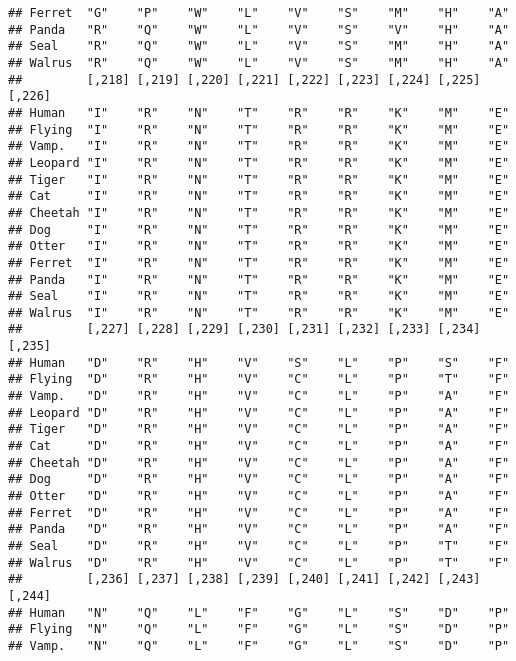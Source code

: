\documentclass[]{article}
\begin{document}
\begin{verbatim}
## Ferret  "G"    "P"    "W"    "L"    "V"    "S"    "M"    "H"    "A"   
## Panda   "R"    "Q"    "W"    "L"    "V"    "S"    "V"    "H"    "A"   
## Seal    "R"    "Q"    "W"    "L"    "V"    "S"    "M"    "H"    "A"   
## Walrus  "R"    "Q"    "W"    "L"    "V"    "S"    "M"    "H"    "A"   
##         [,218] [,219] [,220] [,221] [,222] [,223] [,224] [,225] [,226]
## Human   "I"    "R"    "N"    "T"    "R"    "R"    "K"    "M"    "E"   
## Flying  "I"    "R"    "N"    "T"    "R"    "R"    "K"    "M"    "E"   
## Vamp.   "I"    "R"    "N"    "T"    "R"    "R"    "K"    "M"    "E"   
## Leopard "I"    "R"    "N"    "T"    "R"    "R"    "K"    "M"    "E"   
## Tiger   "I"    "R"    "N"    "T"    "R"    "R"    "K"    "M"    "E"   
## Cat     "I"    "R"    "N"    "T"    "R"    "R"    "K"    "M"    "E"   
## Cheetah "I"    "R"    "N"    "T"    "R"    "R"    "K"    "M"    "E"   
## Dog     "I"    "R"    "N"    "T"    "R"    "R"    "K"    "M"    "E"   
## Otter   "I"    "R"    "N"    "T"    "R"    "R"    "K"    "M"    "E"   
## Ferret  "I"    "R"    "N"    "T"    "R"    "R"    "K"    "M"    "E"   
## Panda   "I"    "R"    "N"    "T"    "R"    "R"    "K"    "M"    "E"   
## Seal    "I"    "R"    "N"    "T"    "R"    "R"    "K"    "M"    "E"   
## Walrus  "I"    "R"    "N"    "T"    "R"    "R"    "K"    "M"    "E"   
##         [,227] [,228] [,229] [,230] [,231] [,232] [,233] [,234] [,235]
## Human   "D"    "R"    "H"    "V"    "S"    "L"    "P"    "S"    "F"   
## Flying  "D"    "R"    "H"    "V"    "C"    "L"    "P"    "T"    "F"   
## Vamp.   "D"    "R"    "H"    "V"    "C"    "L"    "P"    "A"    "F"   
## Leopard "D"    "R"    "H"    "V"    "C"    "L"    "P"    "A"    "F"   
## Tiger   "D"    "R"    "H"    "V"    "C"    "L"    "P"    "A"    "F"   
## Cat     "D"    "R"    "H"    "V"    "C"    "L"    "P"    "A"    "F"   
## Cheetah "D"    "R"    "H"    "V"    "C"    "L"    "P"    "A"    "F"   
## Dog     "D"    "R"    "H"    "V"    "C"    "L"    "P"    "A"    "F"   
## Otter   "D"    "R"    "H"    "V"    "C"    "L"    "P"    "A"    "F"   
## Ferret  "D"    "R"    "H"    "V"    "C"    "L"    "P"    "A"    "F"   
## Panda   "D"    "R"    "H"    "V"    "C"    "L"    "P"    "A"    "F"   
## Seal    "D"    "R"    "H"    "V"    "C"    "L"    "P"    "T"    "F"   
## Walrus  "D"    "R"    "H"    "V"    "C"    "L"    "P"    "T"    "F"   
##         [,236] [,237] [,238] [,239] [,240] [,241] [,242] [,243] [,244]
## Human   "N"    "Q"    "L"    "F"    "G"    "L"    "S"    "D"    "P"   
## Flying  "N"    "Q"    "L"    "F"    "G"    "L"    "S"    "D"    "P"   
## Vamp.   "N"    "Q"    "L"    "F"    "G"    "L"    "S"    "D"    "P"   

\end{verbatim}
\end{document}

